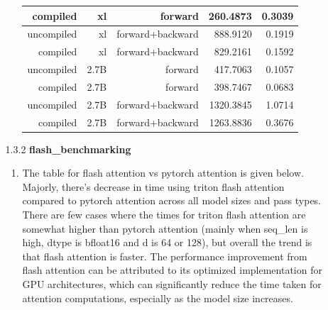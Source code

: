 \documentclass{article}
\begin{document}
\begin{enumerate}[start=1,label=\arabic*.]
\begin{enumerate}
\begin{enumerate}[label=\alph*.]
\begin{table}[h]
\begin{tabular}{|r|r|r|r|r|}
                                \hline
                                compiled & xl & forward & 260.4873 & 0.3039 \\
                                \hline
                                uncompiled & xl & forward+backward & 888.9120 & 0.1919  \\
                                \hline
                                compiled & xl & forward+backward & 829.2161 & 0.1592  \\
                                \hline
                                uncompiled & 2.7B & forward & 417.7063 & 0.1057 \\
                                \hline
                                compiled & 2.7B & forward & 398.7467 & 0.0683 \\
                                \hline
                                uncompiled & 2.7B & forward+backward & 1320.3845 & 1.0714  \\
                                \hline
                                compiled & 2.7B & forward+backward & 1263.8836 & 0.3676  \\
                                \hline
                            \end{tabular}
                    \end{table}
            \end{enumerate}
        \item [1.3.2] \textbf{flash\_benchmarking}
            \begin{enumerate}[label=\alph*.]
                \item The table for flash attention vs pytorch attention is given below. Majorly, there's decrease in time using triton flash attention compared to pytorch attention across all model sizes and pass types. There are few cases where the times for triton flash attention are somewhat higher than pytorch attention (mainly when seq\_len is high, dtype is bfloat16 and d is 64 or 128), but overall the trend is that flash attention is faster. The performance improvement from flash attention can be attributed to its optimized implementation for GPU architectures, which can significantly reduce the time taken for attention computations, especially as the model size increases.
                    \begingroup
                    \tiny
                    \setlength\tabcolsep{2pt}
                    \setlength\LTleft{50pt}
                    \setlength\LTright{0pt}
                    \endgroup
            \end{enumerate}
    \end{enumerate} 
\end{enumerate}
\end{document}
